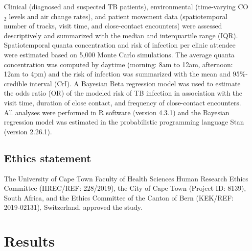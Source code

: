\documentclass[fleqn,11pt]{wlscirep}
\begin{document}
Clinical (diagnosed and suspected TB patients), environmental (time-varying CO$_2$ levels and air change rates), and patient movement data (spatiotemporal number of tracks, visit time, and close-contact encounters) were assessed descriptively and summarized with the median and interquartile range (IQR). Spatiotemporal quanta concentration and risk of infection per clinic attendee were estimated based on 5,000 Monte Carlo simulations. The average quanta concentration was computed by daytime (morning: 8am to 12am, afternoon: 12am to 4pm) and the risk of infection was summarized with the mean and 95\%-credible interval (CrI). A Bayesian Beta regression model was used to estimate the odds ratio (OR) of the modeled risk of TB infection in association with the visit time, duration of close contact, and frequency of close-contact encounters. All analyses were performed in R software (version 4.3.1) and the Bayesian regression model was estimated in the probabilistic programming language Stan (version 2.26.1).

\subsection{Ethics statement}

The University of Cape Town Faculty of Health Sciences Human Research Ethics Committee (HREC/REF: 228/2019), the City of Cape Town (Project ID: 8139), South Africa, and the Ethics Committee of the Canton of Bern (KEK/REF: 2019-02131), Switzerland, approved the study.

\newpage

\section{Results}
\end{document}
